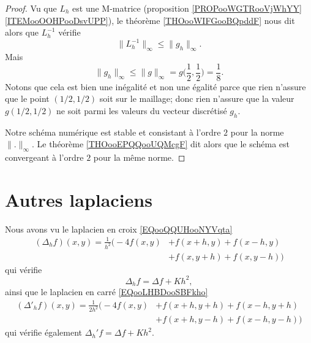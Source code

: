 \begin{proof}
    Vu que \( L_h\) est une M-matrice (proposition \ref{PROPooWGTRooVjWhYY}\ref{ITEMooOOHPooDsvUPP}), le théorème \ref{THOooWIFGooBQpddF} nous dit alors que \( L_h^{-1}\) vérifie
    \begin{equation}
        \| L_h^{-1} \|_{\infty}\leq \| g_h \|_{\infty}.
    \end{equation}
    Mais 
    \begin{equation}
        \| g_h \|_{\infty}\leq \| g \|_{\infty}=g\big( \frac{ 1 }{2},\frac{ 1 }{2} \big)=\frac{1}{ 8 }.
    \end{equation}
    Notons que cela est bien une inégalité et non une égalité parce que rien n'assure que le point \( (1/2,1/2)\) soit sur le maillage; donc rien n'assure que la valeur \( g(1/2,1/2)\) ne soit parmi les valeurs du vecteur discrétisé \( g_h\).

    Notre schéma numérique est stable et consistant à l'ordre \( 2\) pour la norme \( \| . \|_{\infty}\). Le théorème \ref{THOooEPQQooUQMcgF} dit alors que le schéma est convergeant à l'ordre \( 2\) pour la même norme.
\end{proof}

\section{Autres laplaciens}


Nous avons vu le laplacien en croix \eqref{EQooQQUHooNYVqta} 
\begin{subequations}\label{EQooOBWUooDEWKYv} 
    \begin{align}
        (\Delta_hf)(x,y)=\frac{1}{ h^2 }\big( -4f(x,y)&+f(x+h,y)+f(x-h,y)\\
        &+f(x,y+h)+f(x,y-h) \big)
    \end{align}
\end{subequations}
qui vérifie
\begin{equation}        \label{EQooQITHooZVJlVa}
    \Delta_hf=\Delta f+Kh^2,
\end{equation}
ainsi que le laplacien en carré \eqref{EQooLHBDooSBFkho}
\begin{subequations}   \label{EQooUOYVooRpAMOC}
    \begin{align}
    (\Delta'_hf)(x,y)=\frac{1}{ 2h^2 }\Big( -4f(x,y)&+f(x+h,y+h)+f(x-h,y+h)\\
    &+f(x+h,y-h)+f(x-h,y-h) \Big)
    \end{align}
\end{subequations}
qui vérifie également \( \Delta_h'f=\Delta f+Kh^2\).

